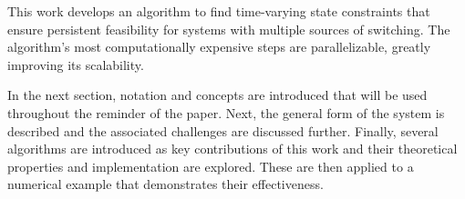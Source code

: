 
This work develops an algorithm to find time-varying state constraints that ensure persistent feasibility for systems with multiple sources of switching. The algorithm's most computationally expensive steps are parallelizable, greatly improving its scalability. 

In the next section, notation and concepts are introduced that will be used throughout the reminder of the paper. Next, the general form of the system is described and the associated challenges are discussed further. Finally, several algorithms are introduced as key contributions of this work and their theoretical properties and implementation are explored. These are then applied to a numerical example that demonstrates their effectiveness. 